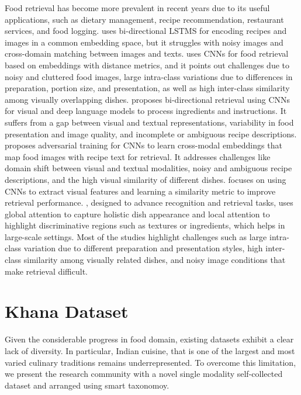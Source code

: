 \documentclass{article}
\begin{document}
Food retrieval has become more prevalent in recent years due to its useful applications, such as dietary management, recipe recommendation, restaurant services, and food logging. \cite{arxiv.2003.03955} uses bi-directional LSTMS for encoding recipes and images in a common embedding space, but it struggles with noisy images and cross-domain matching between images and texts. \cite{Ciocca2017} uses CNNs for food retrieval based on embeddings with distance metrics, and it points out challenges due to noisy and cluttered food images, large intra-class variations due to differences in preparation, portion size, and presentation, as well as high inter-class similarity among visually overlapping dishes. \cite{arxiv.1810.06553} proposes bi-directional retrieval using CNNs for visual and deep language models to process ingredients and instructions. It suffers from a gap between visual and textual representations, variability in food presentation and image quality, and incomplete or ambiguous recipe descriptions. \cite{arxiv.1905.01273} proposes adversarial training for CNNs to learn cross-modal embeddings that map food images with recipe text for retrieval. It addresses challenges like domain shift between visual and textual modalities, noisy and ambiguous recipe descriptions, and the high visual similarity of different dishes. \cite{Shimoda2017} focuses on using CNNs to extract visual features and learning a similarity metric to improve retrieval performance. \cite{Min2020}, designed to advance recognition and retrieval tasks, uses global attention to capture holistic dish appearance and local attention to highlight discriminative regions such as textures or ingredients, which helps in large-scale settings. Most of the studies highlight challenges such as large intra-class variation due to different preparation and presentation styles, high inter-class similarity among visually related dishes, and noisy image conditions that make retrieval difficult.

\section{Khana Dataset}
\label{sec:data}

Given the considerable progress in food domain, existing datasets exhibit a clear lack of diversity. In particular, Indian cuisine, that is one of the largest and most varied culinary traditions remains underrepresented. To overcome this limitation, we present the research community with a novel single modality self-collected dataset and arranged using smart taxonomoy.
\end{document}
